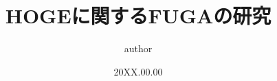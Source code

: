\makeatletter

\def\id#1{\def\@id{#1}}
\def\department#1{\def\@department{#1}}
\def\thesis#1{\def\@thesis{#1}}
\def\university#1{\def\@university{#1}}
\def\supervisor#1{\def\@supervisor{#1}}

\def\@maketitle{
    \begin{center}
    \begin{spacing}{1.5}
    \vspace*{4zh}
    {\LARGE \@university \quad \@department \par}

    {\LARGE \@thesis \par}
    \vspace{25zh}
    {\HUGE \bf \@id \quad \@author \par} 
    \vspace{8zh}
    {\LARGE ( \@date \quad 受理 ) \par}
    \vspace{8zh}
    {\LARGE 指導教官\quad \@supervisor \quad 印 \par}
    \vspace{-45zh}
    \begin{spacing}{0.1}
    {\HUGE \bf \gtfamily \@title \par}
	 \end{spacing}
    \end{spacing}
    \end{center}
}

\makeatother

\title{HOGEに関するFUGAの研究} %
\thesis{令和00年度　卒業研究論文} %
\date{20XX.00.00} %
\id{00000} %
\author{author} %
\university{東京工業高等専門学校} %
\department{電子工学科} %
\supervisor{supervisor} %
